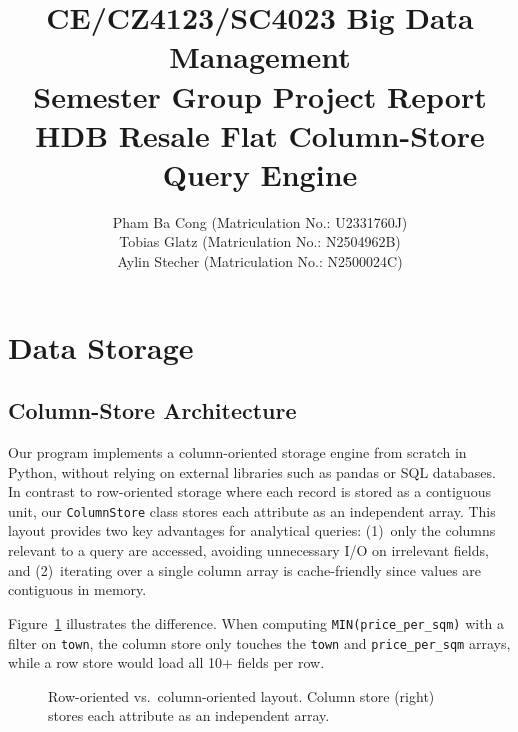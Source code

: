 \documentclass[11pt,a4paper]{article}
\title{
    \vspace{-1.5cm}
    \textbf{CE/CZ4123/SC4023 Big Data Management} \\[0.2cm]
    \large Semester Group Project Report \\[0.1cm]
    \large HDB Resale Flat Column-Store Query Engine
}
\author{
    Pham Ba Cong (Matriculation No.: U2331760J) \\
    Tobias Glatz (Matriculation No.: N2504962B) \\
    Aylin Stecher (Matriculation No.: N2500024C)
}
\date{}
\begin{document}
\maketitle

\section{Data Storage}

\subsection{Column-Store Architecture}

Our program implements a column-oriented storage engine from scratch in Python, without relying on external libraries such as pandas or SQL databases. In contrast to row-oriented storage where each record is stored as a contiguous unit, our \texttt{ColumnStore} class stores each attribute as an independent array. This layout provides two key advantages for analytical queries: (1)~only the columns relevant to a query are accessed, avoiding unnecessary I/O on irrelevant fields, and (2)~iterating over a single column array is cache-friendly since values are contiguous in memory.

Figure~\ref{fig:row-vs-col} illustrates the difference. When computing \texttt{MIN(price\_per\_sqm)} with a filter on \texttt{town}, the column store only touches the \texttt{town} and \texttt{price\_per\_sqm} arrays, while a row store would load all 10+ fields per row.

\begin{figure}[H]
\centering
{}
\caption{Row-oriented vs.\ column-oriented layout. Column store (right) stores each attribute as an independent array.}
\label{fig:row-vs-col}
\end{figure}
\end{document}
